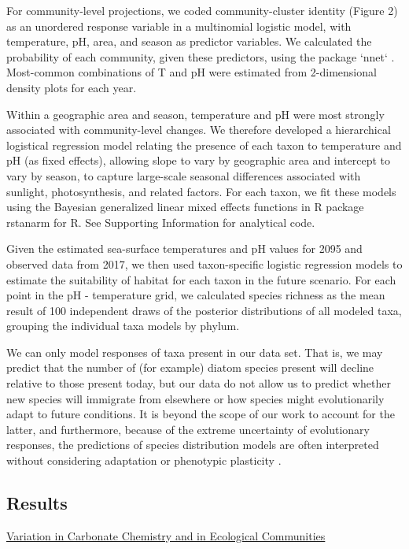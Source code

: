 \documentclass[11pt]{article}
\begin{document}
\begin{linenumbers}
For community-level projections, we coded community-cluster identity (Figure 2) as an unordered response variable in a multinomial logistic model, with temperature, pH, area, and season as predictor variables. We calculated the probability of each community, given these predictors, using the package `nnet` \cite{nnet2002}. Most-common combinations of T and pH were estimated from 2-dimensional density plots for each year. 

Within a geographic area and season, temperature and pH were most strongly associated with community-level changes. We therefore developed a hierarchical logistical regression model relating the presence of each taxon to temperature and pH (as fixed effects), allowing slope to vary by geographic area and intercept to vary by season, to capture large-scale seasonal differences associated with sunlight, photosynthesis, and related factors. For each taxon, we fit these models using the Bayesian generalized linear mixed effects functions in R package rstanarm \cite{rstanarm} for R. See Supporting Information for analytical code. 

Given the estimated sea-surface temperatures and pH values for 2095 and observed data from 2017, we then used taxon-specific logistic regression models to estimate the suitability of habitat for each taxon in the future scenario. For each point in the pH - temperature grid, we calculated species richness as the mean result of 100 independent draws of the posterior distributions of all modeled taxa, grouping the individual taxa models by phylum.

We can only model responses of taxa present in our data set. That is, we may predict that the number of (for example) diatom species present will decline relative to those present today, but our data do not allow us to predict whether new species will immigrate from elsewhere or how species might evolutionarily adapt to future conditions. It is beyond the scope of our work to account for the latter, and furthermore, because of the extreme uncertainty of evolutionary responses, the predictions of species distribution models are often interpreted without considering adaptation or phenotypic plasticity \cite{moore2015present}. 



\subsection*{Results}
\underline{Variation in Carbonate Chemistry and in Ecological Communities}



\end{linenumbers}
\end{document}
